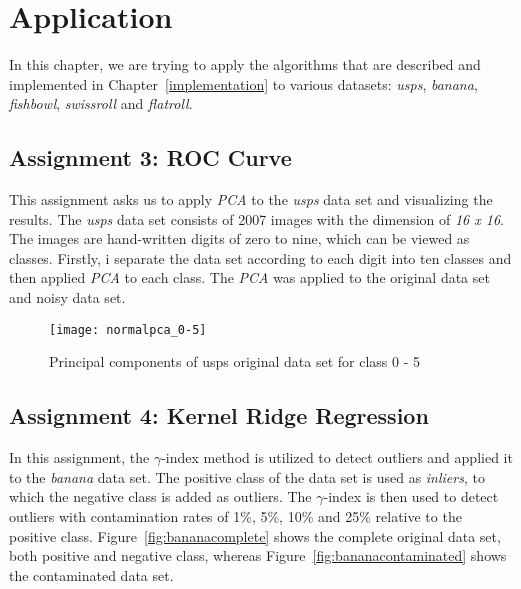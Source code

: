 \chapter{Application}
\label{chap:application}

In this chapter, we are trying to apply the algorithms that are described and implemented in Chapter~\ref{implementation} to various datasets: \textit{usps}, \textit{banana}, \textit{fishbowl}, \textit{swissroll} and \textit{flatroll}.


\section{Assignment 3: ROC Curve}
\label{assignment3}

This assignment asks us to apply \textit{PCA} to the \textit{usps} data set and visualizing the results. The \textit{usps} data set consists of 2007 images with the dimension of \textit{16 x 16}. The images are hand-written digits of zero to nine, which can be viewed as classes. Firstly, i separate the data set according to each digit into ten classes and then applied \textit{PCA} to each class. The \textit{PCA} was applied to the original data set and noisy data set.



\begin{figure}[h!]
	\centering
	\texttt{[image: normalpca\_0-5]}
	\caption{Principal components of usps original data set for class 0 - 5}
	\label{fig:pcaOriginal05}
\end{figure}


\section{Assignment 4: Kernel Ridge Regression}
\label{assignment4}

In this assignment, the $\gamma$-index method is utilized to detect outliers and applied it to the \textit{banana} data set. The positive class of the data set is used as \textit{inliers}, to which the negative class is added as outliers. The $\gamma$-index is then used to detect outliers with contamination rates of 1\%, 5\%, 10\% and 25\% relative to the positive class. Figure~\ref{fig:bananacomplete} shows the complete original data set, both positive and negative class, whereas Figure~\ref{fig:bananacontaminated} shows the contaminated data set.

